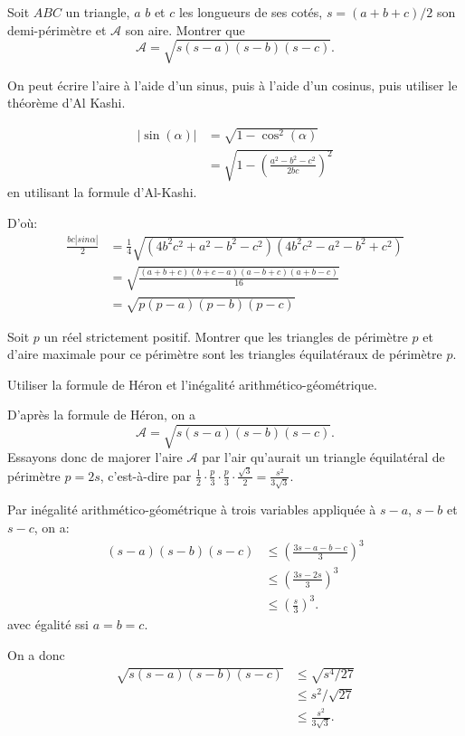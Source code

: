 \begin{exo}
\label{formule_Heron}
Soit $ABC$ un triangle, $a$ $b$ et $c$ les longueurs de ses cotés, $s=(a+b+c)/2$ son demi-périmètre et $\mathcal A$ son aire. Montrer que
\[\mathcal A = \sqrt{s(s-a)(s-b)(s-c)}.\]

\begin{hint} On peut écrire l'aire à l'aide d'un sinus, puis à l'aide d'un cosinus, puis utiliser le théorème d'Al Kashi.
\end{hint}

\begin{sol}
\begin{align*}
|\sin(\alpha)| &= \sqrt{1-\cos^2(\alpha)} \\
&= \sqrt{1-\left(\frac{a^2-b^2-c^2}{2bc}\right)^2}
\end{align*}
en utilisant la formule d'Al-Kashi.


D'où:
\begin{align*}
\frac{bc|sin\alpha|}{2} &= \frac{1}{4}\sqrt{(4b^2c^2+a^2-b^2-c^2)(4b^2c^2-a^2-b^2+c^2)} \\
&= \sqrt{\frac{(a+b+c)(b+c-a)(a-b+c)(a+b-c)}{16}}\\
&= \sqrt{p(p-a)(p-b)(p-c)}
\end{align*}
\end{sol}
\end{exo}

\begin{exo}
Soit $p$ un réel strictement positif. Montrer que les triangles de périmètre $p$ et d'aire maximale pour ce périmètre sont les triangles équilatéraux de périmètre $p$.
\begin{hint}
Utiliser la formule de Héron et l'inégalité arithmético-géométrique.
\end{hint}
\begin{sol}
D'après la formule de Héron, on a 
\[ \mathcal A = \sqrt{s(s-a)(s-b)(s-c)}.\]
Essayons donc de majorer l'aire $\mathcal A$ par l'air qu'aurait un triangle équilatéral de périmètre $p=2s$, c'est-à-dire par $\frac12 \cdot \frac{p}{3}\cdot\frac{p}{3}\cdot \frac{\sqrt 3}{2} = \frac{s^2}{3\sqrt 3}$.

Par inégalité arithmético-géométrique à trois variables appliquée à $s-a$, $s-b$ et $s-c$, on a:
\begin{align*}
(s-a)(s-b)(s-c)
&\leq (\frac{3s-a-b-c}{3})^3\\
&\leq (\frac{3s-2s}{3})^3\\
&\leq (\frac{s}{3})^3.
\end{align*}
avec égalité ssi $a=b=c$.

On a donc
\begin{align*}
\sqrt{s(s-a)(s-b)(s-c)} 
&\leq \sqrt{s^4/27} \\
&\leq  s^2/\sqrt{27}\\
&\leq \frac{s^2}{3\sqrt 3}.
\end{align*}

\end{sol}
\end{exo}






